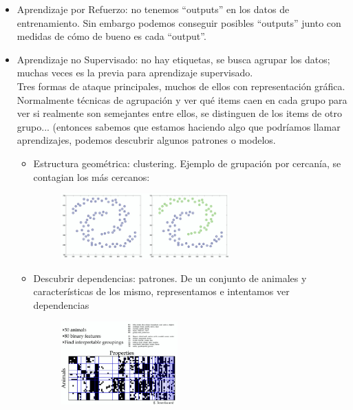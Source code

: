 \documentclass[11pt,a4paper]{article}
\theoremstyle{definition}
\begin{document}
\begin{itemize}
		\item Aprendizaje por Refuerzo: no tenemos ``outputs'' en los datos de entrenamiento. Sin embargo podemos conseguir posibles ``outputs'' junto con medidas de cómo de bueno es cada ``output''.
		\item Aprendizaje no Supervisado: no hay etiquetas, se busca agrupar los datos; muchas veces es la previa para aprendizaje supervisado.\\
		Tres formas de ataque principales, muchos de ellos con representación gráfica. Normalmente técnicas de agrupación y ver qué items caen en cada grupo para ver si realmente son semejantes entre ellos, se distinguen de los items de otro grupo... (entonces sabemos que estamos haciendo algo que podríamos llamar aprendizajes, podemos descubrir algunos patrones o modelos.
		\begin{itemize}
			\item Estructura geométrica: clustering. Ejemplo de grupación por cercanía, se contagian los más cercanos:
			\begin{figure}[htb!]
			\centering
			\includegraphics[width=0.65\textwidth]{images/cluster_cercania}
		\end{figure}
		
		
			\item Descubrir dependencias: patrones. De un conjunto de animales y características de los mismo, representamos e intentamos ver dependencias
			\begin{figure}[htb!]
			\centering
			\includegraphics[width=0.45\textwidth]{images/dependencias_animals}
		\end{figure}
		

\end{itemize}
\end{itemize}
\end{document}
